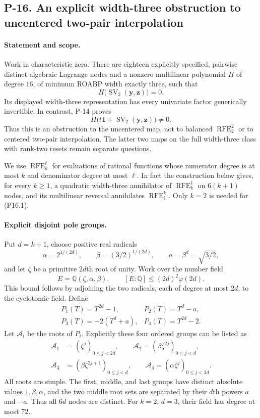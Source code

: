\subsection{P-16. An explicit width-three obstruction to uncentered two-pair interpolation}
\label{P-16}

\paragraph{Statement and scope.}
Work in characteristic zero. There are eighteen explicitly specified,
pairwise distinct algebraic Lagrange nodes and a nonzero multilinear
polynomial $H$ of degree $16$, of minimum ROABP width exactly three,
such that
\[
 H\bigl(\operatorname{SV}_2(\mathbf y,\mathbf z)\bigr)=0.
 \tag{P16.1}
\]
Its displayed width-three representation has every univariate factor
generically invertible. In contrast, P-14 proves
\[
 H\bigl(t\mathbf1+\operatorname{SV}_2(\mathbf y,\mathbf z)\bigr)\ne0.
 \tag{P16.2}
\]
Thus this is an obstruction to the uncentered map, not to balanced
$\operatorname{RFE}_{2}^{2}$ or to centered two-pair interpolation.
The latter two maps on the full width-three class with rank-two resets
remain separate questions.

We use $\operatorname{RFE}_{k}^{\ell}$ for evaluations of rational
functions whose numerator degree is at most $k$ and denominator degree
at most $\ell$. In fact the construction below gives, for every
$k\ge1$, a quadratic width-three annihilator of
$\operatorname{RFE}_{k}^{1}$ on $6(k+1)$ nodes, and its multilinear
reversal annihilates $\operatorname{RFE}_{1}^{k}$. Only $k=2$ is needed
for (P16.1).

\paragraph{Explicit disjoint pole groups.}
Put $d=k+1$, choose positive real radicals
\[
 \alpha=2^{1/(2d)},\qquad \beta=(3/2)^{1/(2d)},
 \qquad a=\beta^d=\sqrt{3/2},
\]
and let $\zeta$ be a primitive $2d$th root of unity. Work over the
number field
\[
 E=\mathbb Q(\zeta,\alpha,\beta),\qquad
 [E:\mathbb Q]\le(2d)^2\varphi(2d).
 \tag{P16.3}
\]
This bound follows by adjoining the two radicals, each of degree at
most $2d$, to the cyclotomic field. Define
\[
 \begin{array}{ll}
 P_1(T)=T^{2d}-1,&P_2(T)=T^d-a,\\
 P_3(T)=-2(T^d+a),&P_4(T)=T^{2d}-2.
 \end{array}
\]
Let $\mathcal A_i$ be the roots of $P_i$. Explicitly these four
ordered groups can be listed as
\[
 \begin{split}
 \mathcal A_1&=(\zeta^j)_{0\le j<2d},\qquad
 \mathcal A_2=(\beta\zeta^{2j})_{0\le j<d},\\
 \mathcal A_3&=(\beta\zeta^{2j+1})_{0\le j<d},\qquad
 \mathcal A_4=(\alpha\zeta^j)_{0\le j<2d}.
 \end{split}
 \tag{P16.4}
\]
All roots are simple. The first, middle, and last groups have distinct
absolute values $1,\beta,\alpha$, and the two middle root sets are
separated by their $d$th powers $a$ and $-a$. Thus all $6d$ nodes
are distinct. For $k=2$, $d=3$, their field has degree at most $72$.

